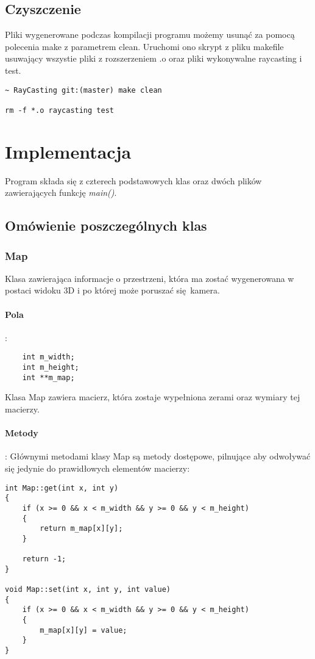 \documentclass[11pt, a4paper]{article}
\begin{document}
\subsection{Czyszczenie}
Pliki wygenerowane podczas kompilacji programu możemy usunąć za pomocą polecenia make z parametrem clean. Uruchomi ono skrypt 
z pliku makefile usuwający wszystie pliki z rozszerzeniem .o oraz pliki wykonywalne raycasting i test.
\begin{lstlisting}
~ RayCasting git:(master) make clean 

rm -f *.o raycasting test
\end{lstlisting}

\section{Implementacja}
Program składa się z czterech podstawowych klas oraz dwóch plików zawierających funkcję \textit{main()}.
\subsection{Omówienie poszczególnych klas}
\subsubsection{Map}
Klasa zawierająca informacje o przestrzeni, która ma zostać wygenerowana w postaci widoku 3D i po której może poruszać się kamera.
\paragraph{Pola}: 
\begin{lstlisting}
    int m_width;
    int m_height;
    int **m_map;
\end{lstlisting}
Klasa Map zawiera macierz, która zostaje wypełniona zerami oraz wymiary tej macierzy.
\paragraph{Metody}: 
Głównymi metodami klasy Map są metody dostępowe, pilnujące aby odwoływać się jedynie do prawidłowych elementów macierzy:
\begin{lstlisting}
int Map::get(int x, int y)
{
    if (x >= 0 && x < m_width && y >= 0 && y < m_height)
    {
        return m_map[x][y];
    }

    return -1;
}

void Map::set(int x, int y, int value)
{
    if (x >= 0 && x < m_width && y >= 0 && y < m_height)
    {
        m_map[x][y] = value;
    }
}
\end{lstlisting}
\end{document}
